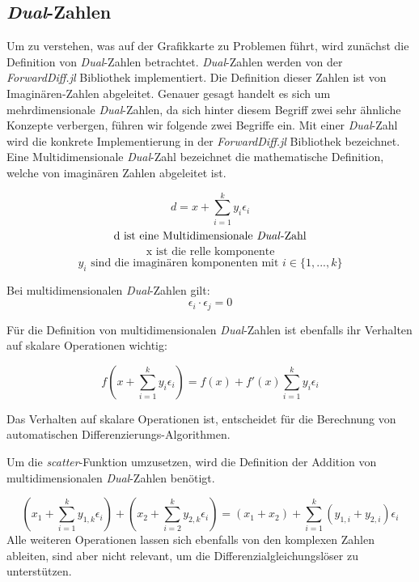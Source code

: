 \subsection{\textit{Dual}-Zahlen} \label{sec:dual_zahlen}

Um zu verstehen, was auf der Grafikkarte zu Problemen führt, 
wird zunächst die Definition von \textit{Dual}-Zahlen betrachtet.
\textit{Dual}-Zahlen werden von der \textit{ForwardDiff.jl} Bibliothek \cite{juliaForwardDiffPackage}
implementiert. 
Die Definition dieser Zahlen ist von Imaginären-Zahlen abgeleitet.
Genauer gesagt handelt es sich um mehrdimensionale \textit{Dual}-Zahlen, 
da sich hinter diesem Begriff zwei sehr ähnliche Konzepte verbergen, 
führen wir folgende zwei Begriffe ein.
Mit einer \textit{Dual}-Zahl wird die konkrete Implementierung in der \textit{ForwardDiff.jl} Bibliothek \cite{juliaForwardDiffPackage} bezeichnet.
Eine Multidimensionale \textit{Dual}-Zahl bezeichnet die mathematische Definition, 
welche von imaginären Zahlen abgeleitet ist.

\begin{equation}
 d = x + \sum_{i = 1}^{k} y_i \epsilon_i 
\end{equation}
$$ \text{ d ist eine Multidimensionale \textit{Dual}-Zahl } $$ 
$$ \text{ x ist die relle komponente } $$ 
$$ y_i \text{ sind die imaginären komponenten mit } i \in \{1, ..., k\} $$

Bei multidimensionalen \textit{Dual}-Zahlen gilt:
\begin{equation}
 \epsilon_i \cdot \epsilon_j = 0
\end{equation}

Für die Definition von multidimensionalen \textit{Dual}-Zahlen \cite{juliaForwardDiffPackage}
ist ebenfalls ihr Verhalten auf skalare Operationen wichtig:

\begin{equation}
 f( x + \sum_{i = 1}^{k} y_i \epsilon_i  ) = f(x) +  f'(x) \sum_{i = 1}^{k} y_i \epsilon_i
\end{equation}

Das Verhalten auf skalare Operationen ist, entscheidet 
für die Berechnung von automatischen Differenzierungs-Algorithmen.

Um die \textit{scatter}-Funktion umzusetzen, 
wird die Definition der Addition von multidimensionalen \textit{Dual}-Zahlen \cite{RecentAdvances} benötigt.

\begin{equation}
(x_1 + \sum_{i = 1}^{k} y_{1,k} \epsilon_i) + ( x_2 + \sum_{i = 2}^{k} y_{2,k} \epsilon_i) = (x_1 + x_2) + \sum_{i = 1}^{k} (y_{1, i} + y_{2, i}) \epsilon_i
\end{equation}
Alle weiteren Operationen lassen sich ebenfalls von den komplexen Zahlen ableiten, 
sind aber nicht relevant, um die Differenzialgleichungslöser zu unterstützen.
